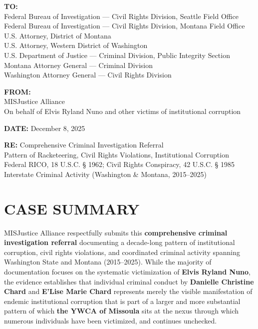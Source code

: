 \documentclass[12pt,oneside]{article}
\begin{document}
\begin{flushleft}

\textbf{TO:} \\
Federal Bureau of Investigation --- Civil Rights Division, Seattle Field Office \\
Federal Bureau of Investigation --- Civil Rights Division, Montana Field Office \\
U.S. Attorney, District of Montana \\
U.S. Attorney, Western District of Washington \\
U.S. Department of Justice --- Criminal Division, Public Integrity Section \\
Montana Attorney General --- Criminal Division \\
Washington Attorney General --- Civil Rights Division

\vspace{0.3in}

\textbf{FROM:} \\
MISJustice Alliance \\
On behalf of Elvis Ryland Nuno and other victims of institutional corruption

\vspace{0.3in}

\textbf{DATE:} December 8, 2025

\vspace{0.3in}

\textbf{RE:} Comprehensive Criminal Investigation Referral \\
Pattern of Racketeering, Civil Rights Violations, Institutional Corruption \\
Federal RICO, 18 U.S.C. § 1962; Civil Rights Conspiracy, 42 U.S.C. § 1985 \\
Interstate Criminal Activity (Washington \& Montana, 2015--2025)

\end{flushleft}

\newpage

\section*{CASE SUMMARY}

MISJustice Alliance respectfully submits this \textbf{comprehensive criminal investigation referral} documenting a decade-long pattern of institutional corruption, civil rights violations, and coordinated criminal activity spanning Washington State and Montana (2015--2025). While the majority of documentation focuses on the systematic victimization of \textbf{Elvis Ryland Nuno}, the evidence establishes that individual criminal conduct by \textbf{Danielle Christine Chard} and \textbf{E'Lise Marie Chard} represents merely the visible manifestation of endemic institutional corruption that is part of a larger and more substantial pattern of which \textbf{the YWCA of Missoula} sits at the nexus through which numerous individuals have been victimized, and continues unchecked.
\end{document}
